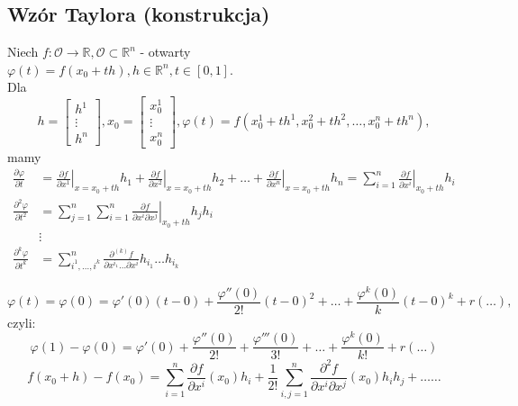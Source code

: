 \documentclass[../main.tex]{subfiles}
\begin{document}
\subsection{Wzór Taylora (konstrukcja)}
Niech $f: \mathcal{O}\to\mathbb{R}, \mathcal{O}\subset \mathbb{R}^n$ - otwarty\\
$\varphi(t) = f(x_0+th), h\in \mathbb{R}^n, t\in[0,1]$.\\
Dla
\[
    h=\left [ \begin{matrix}
h^1\\
\vdots\\
h^n\end{matrix}\right ] ,
x_0 = \left [ \begin{matrix}
x_0^1\\
\vdots\\
x_0^n\end{matrix}\right ],
\varphi(t) = f(x_0^1+th^1,x_0^2+th^2,\dots,x_0^n+th^n)
,\]
mamy
\begin{align*}
    \frac{\partial \varphi}{\partial t} &= \left .\frac{\partial f}{\partial x^1} \right |_{x=x_0+th} h_1 + \left .\frac{\partial f}{\partial x^2} \right |_{x=x_0+th} h_2 + \dots + \left .\frac{\partial f}{\partial x^n} \right |_{x=x_0+th} h_n = \left .\sum_{i=1}^n \frac{\partial f}{\partial x^i} \right |_{x_0+th}h_i\\
    \frac{\partial^2 \varphi}{\partial t^2} &= \left .\sum_{j=1}^n \sum_{i=1}^n \frac{\partial f}{\partial x^i \partial x^j} \right |_{x_0+th} h_j h_i\\
    &\vdots\\
    \frac{\partial^k \varphi}{\partial t^k} &= \sum_{i^1,\dots,i^k}^n \frac{\partial^{(k)} f}{\partial x^{i_{1}} \dots \partial x^{i}} h_{i_1}\dots h_{i_k}
\end{align*}

\[
    \varphi(t) = \varphi(0) = \varphi'(0)(t-0)+\frac{\varphi''(0)}{2!}(t-0)^2+\dots+\frac{\varphi^k(0)}{k}(t-0)^k + r(\dots)
,\]
czyli:
\[
    \varphi(1)-\varphi(0) = \varphi'(0)+\frac{\varphi''(0)}{2!} + \frac{\varphi'''(0)}{3!} + \dots + \frac{\varphi^k(0)}{k!}+r(\dots)
\]
\[
    f(x_0+h)-f(x_0)=\sum_{i=1}^n \frac{\partial f}{\partial x^i} (x_0) h_i + \frac{1}{2!} \sum_{i,j=1}^n \frac{\partial^2 f}{\partial x^i \partial x^j} (x_0)h_ih_j + \dots \dots
\]
\end{document}
